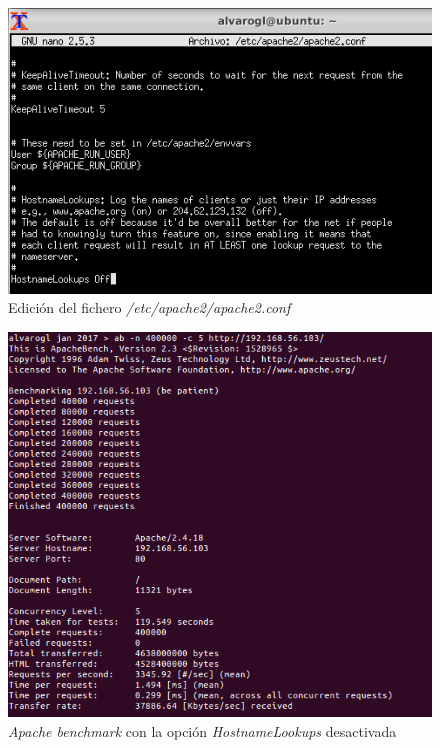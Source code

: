 \begin{figure}[H]
	\centering
	\includegraphics[scale=0.6]{18.png}
	\caption{Edición del fichero \textit{/etc/apache2/apache2.conf}} \label{18}
\end{figure}

\begin{figure}[H]
	\centering
	\includegraphics[scale=0.6]{19.png}
	\caption{\textit{Apache benchmark} con la opción \textit{HostnameLookups} desactivada} \label{19}
\end{figure}

\newpage



